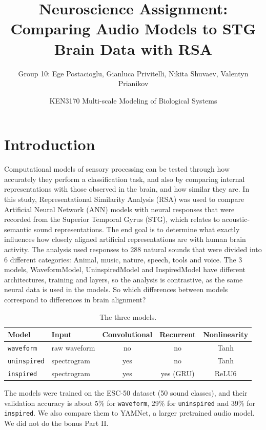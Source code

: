 \documentclass[11pt,a4paper]{article}
\title{Neuroscience Assignment: Comparing Audio Models to STG Brain Data with RSA}
\author{Group 10: Ege Postacioglu, Gianluca Privitelli, Nikita Shuvaev, Valentyn Prianikov}
\date{KEN3170 Multi-scale Modeling of Biological Systems}
\begin{document}
\maketitle

\section{Introduction}

Computational models of sensory processing can be tested through how accurately they
perform a classification task, and also by comparing internal representations with those
observed in the brain, and how similar they are. In this study, Representational Similarity
Analysis (RSA) was used to compare Artificial Neural Network (ANN) models with neural
responses that were recorded from the Superior Temporal Gyrus (STG), which relates
to acoustic-semantic sound representations. The end goal is to determine what exactly
influences how closely aligned artificial representations are with human brain activity.
The analysis used responses to 288 natural sounds that were divided into 6 different
categories: Animal, music, nature, speech, tools and voice. The 3 models, WaveformModel,
UninspiredModel and InspiredModel have different architectures, training and
layers, so the analysis is contrastive, as the same neural data is used in the models. So
which differences between models correspond to differences in brain alignment?

\begin{table}[H]
\centering
\small
\begin{tabular}{llccc}
\toprule
Model & Input & Convolutional & Recurrent & Nonlinearity \\
\midrule
\texttt{waveform}   & raw waveform & no  & no  & Tanh  \\
\texttt{uninspired} & spectrogram  & yes & no  & Tanh  \\
\texttt{inspired}   & spectrogram  & yes & yes (GRU) & ReLU6 \\
\bottomrule
\end{tabular}
\caption{The three models.}
\end{table}

The models were trained on the ESC-50 dataset (50 sound classes), and their validation accuracy is about 5\%
for \texttt{waveform}, 29\% for \texttt{uninspired} and 39\% for \texttt{inspired}. We also compare them to
YAMNet, a larger pretrained audio model. We did not do the bonus Part II.
\end{document}
